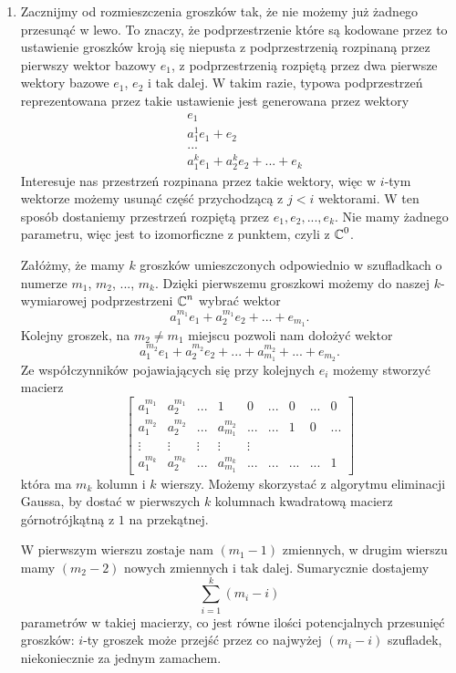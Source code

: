 \begin{enumerate}[label=\textbf{(\alph*)}]
  \item Zacznijmy od rozmieszczenia groszków tak, że nie możemy już żadnego przesunąć w lewo. To znaczy, że podprzestrzenie które są kodowane przez to ustawienie groszków kroją się niepusta z podprzestrzenią rozpinaną przez pierwszy wektor bazowy $e_1$, z podprzestrzenią rozpiętą przez dwa pierwsze wektory bazowe $e_1$, $e_2$ i tak dalej. W takim razie, typowa podprzestrzeń reprezentowana przez takie ustawienie jest generowana przez wektory
    \begin{align*}
      &e_1\\ 
      &a_1^1e_1+e_2\\ 
      &...\\ 
      &a_1^ke_1+a_2^ke_2+...+e_k
    \end{align*}
    Interesuje nas przestrzeń rozpinana przez takie wektory, więc w $i$-tym wektorze możemy usunąć część przychodzącą z $j<i$ wektorami. W ten sposób dostaniemy przestrzeń rozpiętą przez $e_1, e_2, ...,e_k$. Nie mamy żadnego parametru, więc jest to izomorficzne z punktem, czyli z $\operatorname{\mathbb{C}}^0$.

    Załóżmy, że mamy $k$ groszków umieszczonych odpowiednio w szufladkach o numerze $m_1$, $m_2$, ..., $m_k$. Dzięki pierwszemu groszkowi możemy do naszej $k$-wymiarowej podprzestrzeni $\operatorname{\mathbb{C}}^n$ wybrać wektor
    $$a_1^{m_1}e_1+a_2^{m_1}e_2+...+e_{m_1}.$$
    Kolejny groszek, na $m_2\neq m_1$ miejscu pozwoli nam dołożyć wektor
    $$a_1^{m_2}e_1+a_2^{m_2}e_2+...+a_{m_1}^{m_2}+...+e_{m_2}.$$
    Ze współczynników pojawiających się przy kolejnych $e_i$ możemy stworzyć macierz
    $$
    \begin{bmatrix}
      a_1^{m_1} & a_2^{m_1} & ... & 1 & 0 & ... & 0 & ... & 0\\ 
      a_1^{m_2} & a_2^{m_2} & ... & a_{m_1}^{m_2} & ... & ... & 1 & 0 & ...\\ 
      \vdots & \vdots & \vdots & \vdots & \vdots\\ 
      a_1^{m_k} & a_2^{m_k} & ... & a_{m_1}^{m_k} & ... & ... & ... & ... & 1 
    \end{bmatrix}
    $$
    która ma $m_k$ kolumn i $k$ wierszy. Możemy skorzystać z algorytmu eliminacji Gaussa, by dostać w pierwszych $k$ kolumnach kwadratową macierz górnotrójkątną z $1$ na przekątnej. 

    W pierwszym wierszu zostaje nam $(m_1-1)$ zmiennych, w drugim wierszu mamy $(m_2-2)$ nowych zmiennych i tak dalej. Sumarycznie dostajemy
    $$\sum_{i=1}^k(m_i-i)$$
    parametrów w takiej macierzy, co jest równe ilości potencjalnych przesunięć groszków: $i$-ty groszek może przejść przez co najwyżej $(m_i-i)$ szufladek, niekoniecznie za jednym zamachem.


\end{enumerate}
